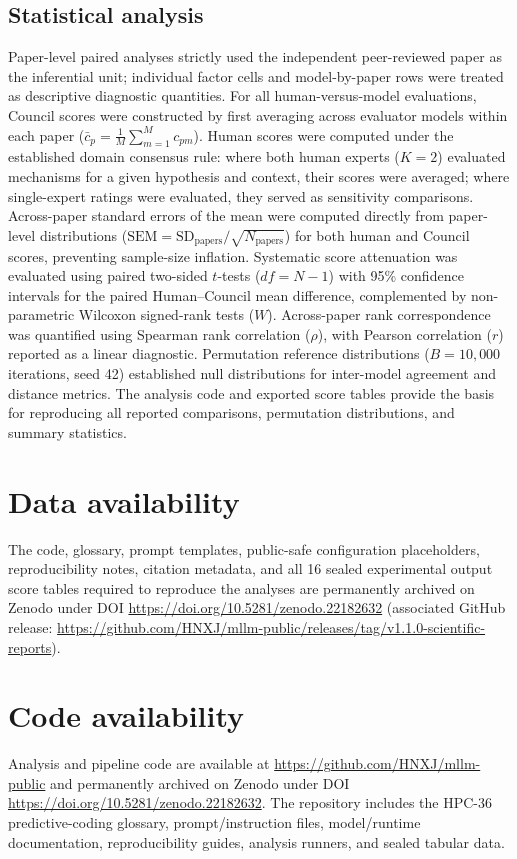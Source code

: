 \documentclass[12pt]{article}
\begin{document}
\subsection{Statistical analysis}\label{statistical-analysis}
Paper-level paired analyses strictly used the independent peer-reviewed paper as the inferential unit; individual factor cells and model-by-paper rows were treated as descriptive diagnostic quantities. For all human-versus-model evaluations, Council scores were constructed by first averaging across evaluator models within each paper ($\bar{c}_p = \frac{1}{M}\sum_{m=1}^M c_{pm}$). Human scores were computed under the established domain consensus rule: where both human experts ($K=2$) evaluated mechanisms for a given hypothesis and context, their scores were averaged; where single-expert ratings were evaluated, they served as sensitivity comparisons. Across-paper standard errors of the mean were computed directly from paper-level distributions ($\text{SEM} = \text{SD}_{\text{papers}}/\sqrt{N_{\text{papers}}}$) for both human and Council scores, preventing sample-size inflation. Systematic score attenuation was evaluated using paired two-sided $t$-tests ($df = N-1$) with 95\% confidence intervals for the paired Human--Council mean difference, complemented by non-parametric Wilcoxon signed-rank tests ($W$). Across-paper rank correspondence was quantified using Spearman rank correlation ($\rho$), with Pearson correlation ($r$) reported as a linear diagnostic. Permutation reference distributions ($B=10{,}000$ iterations, seed 42) established null distributions for inter-model agreement and distance metrics. The analysis code and exported score tables provide the basis for reproducing all reported comparisons, permutation distributions, and summary statistics.



\section*{Data availability}\label{data-availability}
The code, glossary, prompt templates, public-safe configuration placeholders, reproducibility notes, citation metadata, and all 16 sealed experimental output score tables required to reproduce the analyses are permanently archived on Zenodo under DOI \url{https://doi.org/10.5281/zenodo.22182632} (associated GitHub release: \url{https://github.com/HNXJ/mllm-public/releases/tag/v1.1.0-scientific-reports}).

\section*{Code availability}\label{code-availability}
Analysis and pipeline code are available at \url{https://github.com/HNXJ/mllm-public} and permanently archived on Zenodo under DOI \url{https://doi.org/10.5281/zenodo.22182632}. The repository includes the HPC-36 predictive-coding glossary, prompt/instruction files, model/runtime documentation, reproducibility guides, analysis runners, and sealed tabular data.
\end{document}
